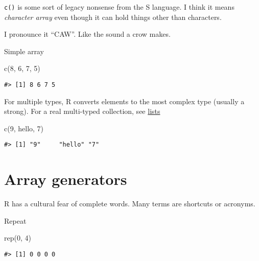 \documentclass[
]{book}
\newenvironment{Shaded}{\begin{snugshade}}{\end{snugshade}}
\newcommand{\DecValTok}[1]{\textcolor[rgb]{0.00,0.00,0.81}{#1}}
\newcommand{\FunctionTok}[1]{\textcolor[rgb]{0.00,0.00,0.00}{#1}}
\newcommand{\NormalTok}[1]{#1}
\newcommand{\StringTok}[1]{\textcolor[rgb]{0.31,0.60,0.02}{#1}}
\begin{document}
\texttt{c()} is some sort of legacy nonsense from the S language. I think it means \emph{character array} even though it can hold things other than characters.

I pronounce it ``CAW''. Like the sound a crow makes.

Simple array

\begin{Shaded}
\begin{Highlighting}[]
\FunctionTok{c}\NormalTok{(}\DecValTok{8}\NormalTok{, }\DecValTok{6}\NormalTok{, }\DecValTok{7}\NormalTok{, }\DecValTok{5}\NormalTok{)}
\end{Highlighting}
\end{Shaded}

\begin{verbatim}
#> [1] 8 6 7 5
\end{verbatim}

For multiple types, R converts elements to the most complex type (usually a strong). For a real multi-typed collection, see \href{lists.html}{lists}

\begin{Shaded}
\begin{Highlighting}[]
\FunctionTok{c}\NormalTok{(}\DecValTok{9}\NormalTok{, }\StringTok{\textquotesingle{}hello\textquotesingle{}}\NormalTok{, }\DecValTok{7}\NormalTok{)}
\end{Highlighting}
\end{Shaded}

\begin{verbatim}
#> [1] "9"     "hello" "7"
\end{verbatim}

\hypertarget{array-generators}{%
\section{Array generators}\label{array-generators}}

R has a cultural fear of complete words. Many terms are shortcuts or acronyms.

Repeat

\begin{Shaded}
\begin{Highlighting}[]
\FunctionTok{rep}\NormalTok{(}\DecValTok{0}\NormalTok{, }\DecValTok{4}\NormalTok{)}
\end{Highlighting}
\end{Shaded}

\begin{verbatim}
#> [1] 0 0 0 0
\end{verbatim}
\end{document}
